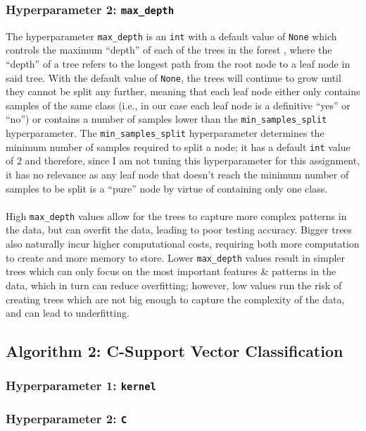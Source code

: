 \documentclass[a4paper]{article}
\begin{document}
\subsubsection{Hyperparameter 2: \texttt{max_depth}}
The hyperparameter \texttt{max_depth} is an \texttt{int} with a default value of \texttt{None} which controls the maximum ``depth'' of each of the trees in the forest \supercite{scikit_randomforestclassifier}, where the ``depth'' of a tree refers to the longest path from the root node to a leaf node in said tree.
With the default value of \texttt{None}, the trees will continue to grow until they cannot be split any further, meaning that each leaf node either only contains samples of the same class (i.e., in our case each leaf node is a definitive ``yes'' or ``no'') or contains a number of samples lower than the \texttt{min_samples_split} hyperparameter.
The \texttt{min_samples_split} hyperparameter determines the minimum number of samples required to split a node; it has a default \texttt{int} value of 2 and therefore, since I am not tuning this hyperparameter for this assignment, it has no relevance as any leaf node that doesn't reach the minimum number of samples to be split is a ``pure'' node by virtue of containing only one class.
\\\\
High \texttt{max_depth} values allow for the trees to capture more complex patterns in the data, but can overfit the data, leading to poor testing accuracy.
Bigger trees also naturally incur higher computational costs, requiring both more computation to create and more memory to store. 
Lower \texttt{max_depth} values result in simpler trees which can only focus on the most important features \& patterns in the data, which in turn can reduce overfitting;
however, low values run the risk of creating trees which are not big enough to capture the complexity of the data, and can lead to underfitting.

\subsection{Algorithm 2: C-Support Vector Classification}
\subsubsection{Hyperparameter 1: \texttt{kernel}}
\subsubsection{Hyperparameter 2: \texttt{C}}

%
%
% 
% 


\nocite{*}
\printbibliography
\end{document}

